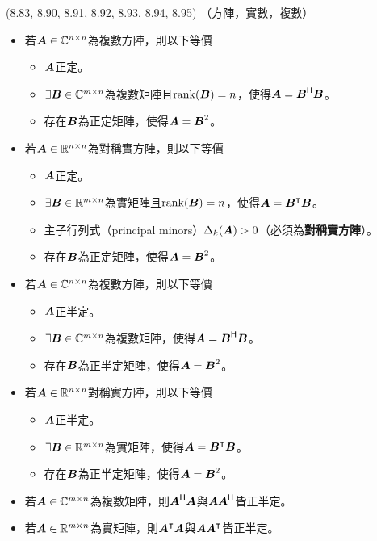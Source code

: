 \item \begin{theorem}{(8.83, 8.90, 8.91, 8.92, 8.93, 8.94, 8.95)} （方陣，實數，複數）
	\begin{itemize}
		\item 若$\boldsymbol{A} \in \mathbb{C}^{n \times n}$為複數方陣，則以下等價
			\begin{itemize}
				\item $\boldsymbol{A}$正定。
				\item $\exists \boldsymbol{B} \in \mathbb{C}^{m \times n}$為複數矩陣且\textbf{$\operatorname{rank}(\boldsymbol{B}) = n$}，使得$\boldsymbol{A} = \boldsymbol{B}^{\mathsf{H}}\boldsymbol{B}$。
				\item 存在$\boldsymbol{B}$為正定矩陣，使得$\boldsymbol{A} = \boldsymbol{B}^2$。
			\end{itemize}
		\item 若$\boldsymbol{A} \in \mathbb{R}^{n \times n}$為對稱實方陣，則以下等價
			\begin{itemize}
				\item $\boldsymbol{A}$正定。
				\item $\exists \boldsymbol{B} \in \mathbb{R}^{m \times n}$為實矩陣且\textbf{$\operatorname{rank}(\boldsymbol{B}) = n$}，使得$\boldsymbol{A} = \boldsymbol{B}^\intercal\boldsymbol{B}$。
				\item 主子行列式（principal minors）$\Delta_k(\boldsymbol{A}) > 0$（必須為\textbf{對稱實方陣}）。
				\item 存在$\boldsymbol{B}$為正定矩陣，使得$\boldsymbol{A} = \boldsymbol{B}^2$。
			\end{itemize}
		\item 若$\boldsymbol{A} \in \mathbb{C}^{n \times n}$為複數方陣，則以下等價
			\begin{itemize}
				\item $\boldsymbol{A}$正半定。
				\item $\exists \boldsymbol{B} \in \mathbb{C}^{m \times n}$為複數矩陣，使得$\boldsymbol{A} = \boldsymbol{B}^{\mathsf{H}}\boldsymbol{B}$。
				\item 存在$\boldsymbol{B}$為正半定矩陣，使得$\boldsymbol{A} = \boldsymbol{B}^2$。
			\end{itemize}
		\item 若$\boldsymbol{A} \in \mathbb{R}^{n \times n}$對稱實方陣，則以下等價
			\begin{itemize}
				\item $\boldsymbol{A}$正半定。
				\item $\exists \boldsymbol{B} \in \mathbb{R}^{m \times n}$為實矩陣，使得$\boldsymbol{A} = \boldsymbol{B}^\intercal\boldsymbol{B}$。
				\item 存在$\boldsymbol{B}$為正半定矩陣，使得$\boldsymbol{A} = \boldsymbol{B}^2$。
			\end{itemize}
		\item 若$\boldsymbol{A} \in \mathbb{C}^{m \times n}$為複數矩陣，則$\boldsymbol{A}^{\mathsf{H}}\boldsymbol{A}$與$\boldsymbol{A}\boldsymbol{A}^{\mathsf{H}}$皆正半定。
		\item 若$\boldsymbol{A} \in \mathbb{R}^{m \times n}$為實矩陣，則$\boldsymbol{A}^\intercal\boldsymbol{A}$與$\boldsymbol{A}\boldsymbol{A}^\intercal$皆正半定。
	\end{itemize}
\end{theorem}

